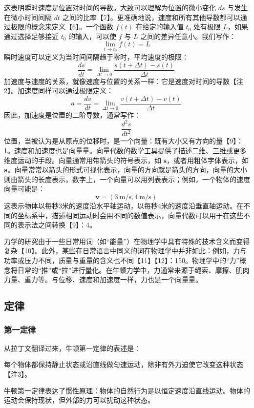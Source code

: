这表明瞬时速度是位置对时间的导数。大致可以理解为位置的微小变化 \( ds \) 与发生在微小时间间隔 \( dt \) 之间的比率【7】。更准确地说，速度和所有其他导数都可以通过极限的概念来定义【6】。一个函数 \( f(t) \) 在给定的输入值 \( t_0 \) 处有极限 \( L \)，如果通过选择足够接近 \( t_0 \) 的输入，可以使 \( f \) 与 \( L \) 之间的差异任意小。我们写作：
\[
\lim _{t\to t_{0}}f(t)=L~
\]
瞬时速度可以定义为当时间间隔趋于零时，平均速度的极限：
\[
\frac{ds}{dt}=\lim _{\Delta t\to 0}\frac{s(t+\Delta t)-s(t)}{\Delta t}~
\]
加速度与速度的关系，就像速度与位置的关系一样：它是速度对时间的导数【注2】。加速度同样可以通过极限定义：
\[
a=\frac{dv}{dt}=\lim _{\Delta t\to 0}\frac{v(t+\Delta t)-v(t)}{\Delta t}~
\]
因此，加速度是位置的二阶导数，通常写作：
\[
\frac{d^{2}s}{dt^{2}}~
\]
位置，当被认为是从原点的位移时，是一个向量：既有大小又有方向的量【9】：1。速度和加速度也是向量量。向量代数的数学工具提供了描述二维、三维或更多维度运动的手段。向量通常用带箭头的符号表示，如 \( \mathbf{s} \)，或者用粗体字体表示，如 \( {\bf {s}} \)。向量常常以箭头的形式可视化表示，向量的方向就是箭头的方向，向量的大小则由箭头的长度表示。数字上，一个向量可以用列表表示；例如，一个物体的速度向量可能是：
\[
\mathbf{v} = (3 \ \mathrm{m/s}, 4 \ \mathrm{m/s})~
\]
这表示物体以每秒3米的速度沿水平轴运动，以每秒4米的速度沿垂直轴运动。在不同的坐标系中，描述相同运动时会用不同的数值表示，向量代数可以用于在这些不同的表示法之间转换【9】：4。

力学的研究由于一些日常用词（如“能量”）在物理学中具有特殊的技术含义而变得复杂【10】。此外，某些在日常语言中同义的词在物理学中并非如此：例如，力与功率或压力不同，质量与重量的含义也不同【11】【12】：150。物理学中的“力”概念将日常的“推”或“拉”进行量化。在牛顿力学中，力通常来源于绳索、摩擦、肌肉力量、重力等。与位移、速度和加速度一样，力也是一个向量量。
\subsection{定律}
\subsubsection{第一定律}
从拉丁文翻译过来，牛顿第一定律的表述是：

每个物体都保持静止状态或沿直线做匀速运动，除非有外力迫使它改变这种状态【注3】。

牛顿第一定律表达了惯性原理：物体的自然行为是以恒定速度沿直线运动。物体的运动会保持现状，但外部的力可以扰动这种状态。